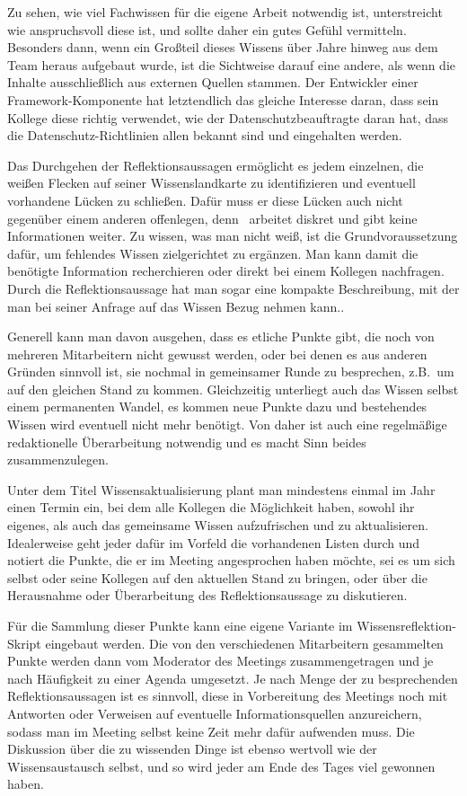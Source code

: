 Zu sehen, wie viel Fachwissen für die eigene Arbeit notwendig ist, unterstreicht wie anspruchsvoll diese ist, und sollte daher ein gutes Gefühl vermitteln. Besonders dann, wenn ein Großteil dieses Wissens über Jahre hinweg aus dem Team heraus aufgebaut wurde, ist die Sichtweise darauf eine andere, als wenn die Inhalte ausschließlich aus externen Quellen stammen. Der Entwickler einer Framework-Komponente hat letztendlich das gleiche Interesse daran, dass sein Kollege diese richtig verwendet, wie der Datenschutzbeauftragte daran hat, dass die Datenschutz-Richtlinien allen bekannt sind und eingehalten werden.

Das Durchgehen der Reflektionsaussagen ermöglicht es jedem einzelnen, die weißen Flecken auf seiner Wissenslandkarte zu identifizieren und eventuell vorhandene Lücken zu schließen. Dafür muss er diese Lücken auch nicht gegenüber einem anderen offenlegen, denn \FPZ\ arbeitet diskret und gibt keine Informationen weiter. Zu wissen, was man nicht weiß, ist die Grundvoraussetzung dafür, um fehlendes Wissen zielgerichtet zu ergänzen. Man kann damit die benötigte Information recherchieren oder direkt bei einem Kollegen nachfragen. Durch die Reflektionsaussage hat man sogar eine kompakte Beschreibung, mit der man bei seiner Anfrage auf das Wissen Bezug nehmen kann..

Generell kann man davon ausgehen, dass es etliche Punkte gibt, die noch von mehreren Mitarbeitern nicht gewusst werden, oder bei denen es aus anderen Gründen sinnvoll ist, sie nochmal in gemeinsamer Runde zu besprechen, z.B.\ um auf den gleichen Stand zu kommen. Gleichzeitig unterliegt auch das Wissen selbst einem permanenten Wandel, es kommen neue Punkte dazu und bestehendes Wissen wird eventuell nicht mehr benötigt. Von daher ist auch eine regelmäßige redaktionelle Überarbeitung notwendig und es macht Sinn beides zusammenzulegen.

Unter dem Titel Wissensaktualisierung plant man mindestens einmal im Jahr einen Termin ein, bei dem alle Kollegen die Möglichkeit haben, sowohl ihr eigenes, als auch das gemeinsame Wissen aufzufrischen und zu aktualisieren. Idealerweise geht jeder dafür im Vorfeld die vorhandenen Listen durch und notiert die Punkte, die er im Meeting angesprochen haben möchte, sei es um sich selbst oder seine Kollegen auf den aktuellen Stand zu bringen, oder über die Herausnahme oder Überarbeitung des Reflektionsaussage zu diskutieren. 

Für die Sammlung dieser Punkte kann eine eigene Variante im Wissensreflektion-Skript eingebaut werden. Die von den verschiedenen Mitarbeitern gesammelten Punkte werden dann vom Moderator des Meetings zusammengetragen und je nach Häufigkeit zu einer Agenda umgesetzt. Je nach Menge der zu besprechenden Reflektionsaussagen ist es sinnvoll, diese in Vorbereitung des Meetings noch mit Antworten oder Verweisen auf eventuelle Informationsquellen anzureichern, sodass man im Meeting selbst keine Zeit mehr dafür aufwenden muss. Die Diskussion über die zu wissenden Dinge ist ebenso wertvoll wie der Wissensaustausch selbst, und so wird jeder am Ende des Tages viel gewonnen haben.


